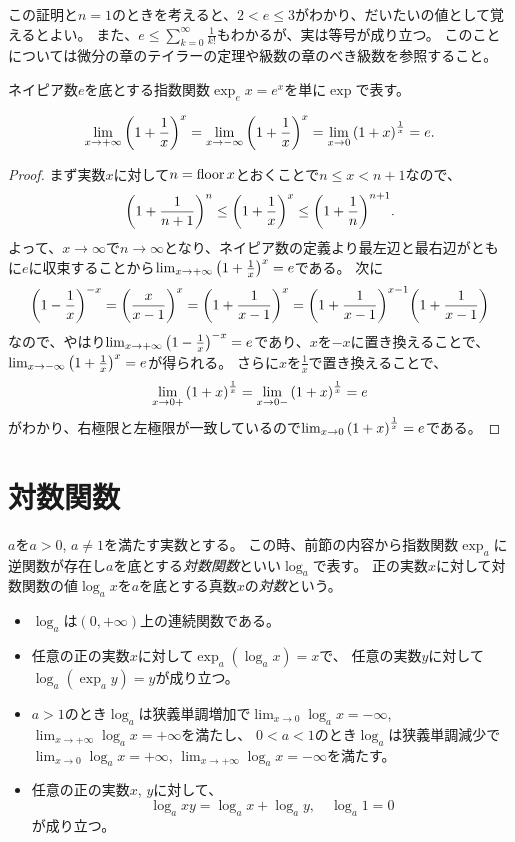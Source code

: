 \begin{remark}
この証明と$n = 1$のときを考えると、$2 < e \le 3$がわかり、だいたいの値として覚えるとよい。
また、$e \le \sum_{k = 0}^\infty \frac{1}{k!}$もわかるが、実は等号が成り立つ。
このことについては微分の章のテイラーの定理や級数の章のべき級数を参照すること。
\end{remark}

ネイピア数$e$を底とする指数関数$\exp_e x = e^x$を単に$\exp$で表す。

\begin{proposition}
\label{t_limit_napier}
$$
\lim_{x \to +\infty}\qty(1+\frac{1}{x})^x = \lim_{x \to -\infty}\qty(1+\frac{1}{x})^x = \lim_{x \to 0}\qty(1+x)^\frac{1}{x} = e.
$$
\end{proposition}

\begin{proof}
まず実数$x$に対して$n = \operatorname{floor}{x}$とおくことで$n \le x < n+1$なので、
$$
\qty(1+\frac{1}{n+1})^n \le \qty(1+\frac{1}{x})^x \le \qty(1+\frac{1}{n})^{n+1}.
$$
よって、$x \to \infty$で$n \to \infty$となり、ネイピア数の定義より最左辺と最右辺がともに$e$に収束することから$\lim_{x \to +\infty}\qty(1+\frac{1}{x})^x = e$である。
次に
$$
\qty(1-\frac{1}{x})^{-x} = \qty(\frac{x}{x-1})^x = \qty(1+\frac{1}{x-1})^x = \qty(1+\frac{1}{x-1})^{x-1}\qty(1+\frac{1}{x-1})
$$
なので、やはり$\lim_{x \to +\infty}\qty(1-\frac{1}{x})^{-x} = e$であり、$x$を$-x$に置き換えることで、$\lim_{x \to -\infty}\qty(1+\frac{1}{x})^x = e$が得られる。
さらに$x$を$\frac{1}{x}$で置き換えることで、
$$
\lim_{x \to 0+}\qty(1+x)^\frac{1}{x} = \lim_{x \to 0-}\qty(1+x)^\frac{1}{x} = e
$$
がわかり、右極限と左極限が一致しているので$\lim_{x \to 0}\qty(1+x)^\frac{1}{x} = e$である。
\end{proof}

\section{対数関数}

$a$を$a > 0$, $a \ne 1$を満たす実数とする。
この時、前節の内容から指数関数$\exp_a$に逆関数が存在し$a$を底とする\emph{対数関数}といい$\log_a$で表す。
正の実数$x$に対して対数関数の値$\log_a x$を$a$を底とする真数$x$の\emph{対数}という。

\begin{itemize}
\item
$\log_a$は$(0, +\infty)$上の連続関数である。
\item
任意の正の実数$x$に対して$\exp_a(\log_a x) = x$で、
任意の実数$y$に対して$\log_a(\exp_a y) = y$が成り立つ。
\item
$a > 1$のとき$\log_a$は狭義単調増加で$\lim_{x \to 0}\log_a x = -\infty$, $\lim_{x \to +\infty}\log_a x = +\infty$を満たし、
$0 < a < 1$のとき$\log_a$は狭義単調減少で$\lim_{x \to 0}\log_a x = +\infty$, $\lim_{x \to +\infty}\log_a x = -\infty$を満たす。
\item
任意の正の実数$x$, $y$に対して、
$$
\log_a x y = \log_a x+\log_a y, \quad \log_a 1 = 0
$$
が成り立つ。
\end{itemize}

